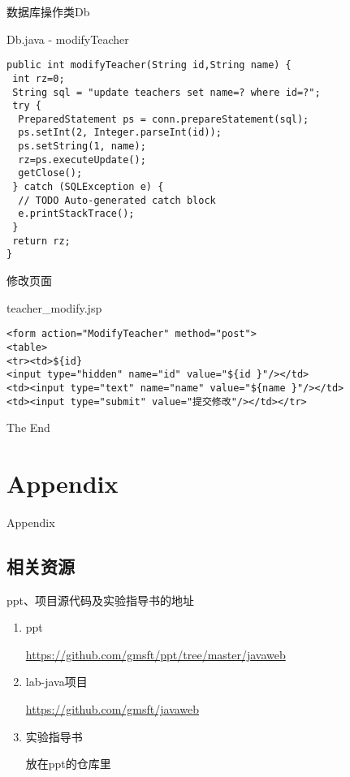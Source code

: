 \documentclass{beamer}
\begin{document}
\begin{frame}[fragile]{数据库操作类Db}
\begin{block}{Db.java - modifyTeacher}
\begin{verbatim}
public int modifyTeacher(String id,String name) {
 int rz=0;
 String sql = "update teachers set name=? where id=?";
 try {
  PreparedStatement ps = conn.prepareStatement(sql);
  ps.setInt(2, Integer.parseInt(id));
  ps.setString(1, name);
  rz=ps.executeUpdate();
  getClose();
 } catch (SQLException e) {
  // TODO Auto-generated catch block
  e.printStackTrace();
 }
 return rz;
}
\end{verbatim}
\end{block}
\end{frame}

\begin{frame}[fragile]{修改页面}
\begin{block}{teacher\_modify.jsp}
\begin{verbatim}
<form action="ModifyTeacher" method="post">
<table>
<tr><td>${id}
<input type="hidden" name="id" value="${id }"/></td>
<td><input type="text" name="name" value="${name }"/></td>
<td><input type="submit" value="提交修改"/></td></tr>
\end{verbatim}
\end{block}
\end{frame}

\begin{frame}
\Huge{\centerline{The End}}
\end{frame}
\section{Appendix}

\begin{frame}
\Huge{\centerline{Appendix}}
\end{frame}

\subsection{相关资源}
\begin{frame}
\begin{block}{ppt、项目源代码及实验指导书的地址}
\begin{enumerate}
\item
ppt

\url{https://github.com/gmsft/ppt/tree/master/javaweb}
\item
lab-java项目

\url{https://github.com/gmsft/javaweb}

\item
实验指导书

放在ppt的仓库里
\end{enumerate}
\end{block}
\end{frame}



\end{document}
